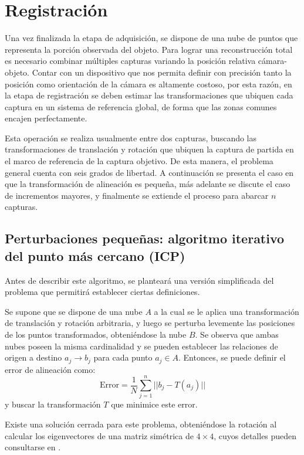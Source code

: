 \section{Registración}
Una vez finalizada la etapa de adquisición, se dispone de una nube de puntos
que representa la porción observada del objeto.
Para lograr una reconstrucción total es necesario combinar múltiples capturas
variando la posición relativa cámara-objeto.
Contar con un dispositivo que nos permita definir con precisión
tanto la posición como orientación de la cámara es altamente costoso,
por esta razón, en la etapa de registración se deben estimar las transformaciones que ubiquen cada
captura en un sistema de referencia global, de forma que las zonas comunes encajen perfectamente.


Esta operación se realiza usualmente entre dos capturas,
buscando las transformaciones de translación y rotación que ubiquen
la captura de partida en el marco de referencia de la captura objetivo.
De esta manera, el problema general cuenta con seis grados de libertad.
A continuación se presenta el caso en que
la transformación de alineación es pequeña,
más adelante se discute el caso de incrementos mayores,
y finalmente se extiende el proceso para abarcar $n$ capturas.



\subsection{Perturbaciones pequeñas: algoritmo iterativo del punto más cercano (ICP)}
Antes de describir este algoritmo, se planteará una versión simplificada del problema
que permitirá establecer ciertas definiciones.

Se supone que se dispone de una nube $A$ a la cual se le aplica
una transformación de translación y rotación arbitraria,
y luego se perturba levemente
las posiciones de los puntos transformados,
obteniéndose la nube $B$.
Se observa que ambas nubes poseen la misma cardinalidad y se pueden establecer las relaciones de origen a destino
$a_j \to b_j$ para cada punto $a_j \in A$.
Entonces, se puede definir el error de alineación como:
\[
	\text{Error} = \frac{1}{N} \sum_{j=1}^n || b_j - T \left(a_j\right) ||
\]
y buscar la transformación $T$ que minimice este error.

Existe una solución cerrada para este problema, obteniéndose la rotación al
calcular los eigenvectores de una matriz simétrica de $4\times4$,
cuyos detalles pueden consultarse en \cite{Horn87closed-formsolution}.

